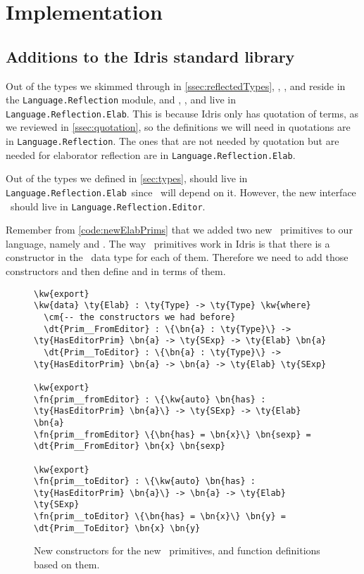 \chapter{Implementation}\label{chap:implementation}

\section{Additions to the Idris standard library}\label{sec:stdlib}

\newcommand{\LR}{\texttt{Language.Reflection}}
\newcommand{\LRE}{\texttt{Language.Reflection.Elab}}
\newcommand{\LREd}{\texttt{Language.Reflection.Editor}}

Out of the types we skimmed through in \autoref{ssec:reflectedTypes}, \TT,
\Raw, and  reside in the \texttt{Language.Reflection} module, and
, , and  live in \LRE. This is because
Idris only has quotation of terms, as we reviewed in \autoref{ssec:quotation},
so the definitions we will need in quotations are in \LR. The ones that are not
needed by quotation but are needed for elaborator reflection are in \LRE.

Out of the types we defined in \autoref{sec:types},  should live in
\LRE\ since \Elab\ will depend on it. However, the new interface
\Editorable\ should live in \LREd.

Remember from \autoref{code:newElabPrims} that we added two new
\Elab\ primitives to our language, namely  and
.
The way \Elab\ primitives work in Idris is that there is a constructor in the
\Elab\ data type for each of them. Therefore we need to add those constructors
and then define  and  in terms of
them.

\begin{figure}[ht]
\caption{New constructors for the new \Elab\ primitives, and function definitions based on them.}
  \label{code:newElabConstructors}
\begin{Verbatim}[framesep=2mm, label=\footnotesize{\normalfont{Idris}}, labelposition=topline]
\kw{export}
\kw{data} \ty{Elab} : \ty{Type} -> \ty{Type} \kw{where}
  \cm{-- the constructors we had before}
  \dt{Prim__FromEditor} : \{\bn{a} : \ty{Type}\} -> \ty{HasEditorPrim} \bn{a} -> \ty{SExp} -> \ty{Elab} \bn{a}
  \dt{Prim__ToEditor} : \{\bn{a} : \ty{Type}\} -> \ty{HasEditorPrim} \bn{a} -> \bn{a} -> \ty{Elab} \ty{SExp}

\kw{export}
\fn{prim__fromEditor} : \{\kw{auto} \bn{has} : \ty{HasEditorPrim} \bn{a}\} -> \ty{SExp} -> \ty{Elab} \bn{a}
\fn{prim__fromEditor} \{\bn{has} = \bn{x}\} \bn{sexp} = \dt{Prim__FromEditor} \bn{x} \bn{sexp}

\kw{export}
\fn{prim__toEditor} : \{\kw{auto} \bn{has} : \ty{HasEditorPrim} \bn{a}\} -> \bn{a} -> \ty{Elab} \ty{SExp}
\fn{prim__toEditor} \{\bn{has} = \bn{x}\} \bn{y} = \dt{Prim__ToEditor} \bn{x} \bn{y}
\end{Verbatim}
\end{figure}

